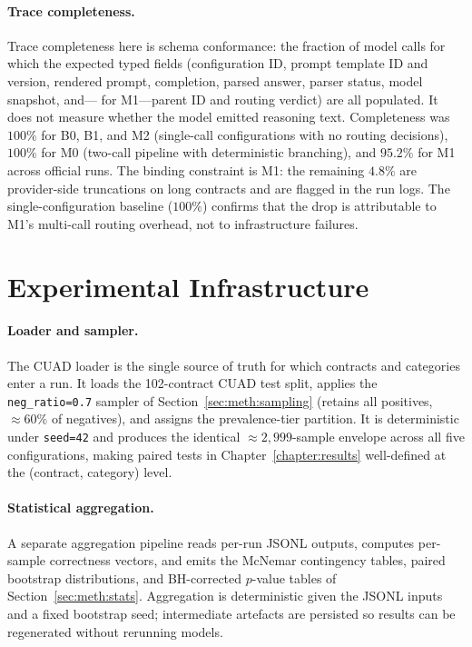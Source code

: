 \paragraph{Trace completeness.}
Trace completeness here is schema conformance: the fraction of model calls for
which the expected typed fields (configuration ID, prompt template ID and version,
rendered prompt, completion, parsed answer, parser status, model snapshot, and---
for M1---parent ID and routing verdict) are all populated. It does not measure
whether the model emitted reasoning text. Completeness was $100\%$ for B0, B1,
and M2 (single-call configurations with no routing decisions), $100\%$ for M0
(two-call pipeline with deterministic branching), and $95.2\%$ for M1 across
official runs. The binding constraint is M1: the remaining $4.8\%$ are
provider-side truncations on long contracts and are flagged in the run logs.
The single-configuration baseline ($100\%$) confirms that the drop is
attributable to M1's multi-call routing overhead, not to infrastructure failures.

\section{Experimental Infrastructure}\label{sec:sys:infra}

\paragraph{Loader and sampler.}
The CUAD loader is the single source of truth for which contracts and categories
enter a run. It loads the 102-contract CUAD test split, applies the
\texttt{neg\_ratio=0.7} sampler of Section~\ref{sec:meth:sampling} (retains all
positives, $\approx\!60\%$ of negatives), and assigns the prevalence-tier
partition. It is deterministic under \texttt{seed=42} and produces the identical
$\approx\!2{,}999$-sample envelope across all five configurations, making paired
tests in Chapter~\ref{chapter:results} well-defined at the (contract, category)
level.

\paragraph{Statistical aggregation.}
A separate aggregation pipeline reads per-run JSONL outputs, computes per-sample
correctness vectors, and emits the McNemar contingency tables, paired bootstrap
distributions, and BH-corrected $p$-value tables of Section~\ref{sec:meth:stats}.
Aggregation is deterministic given the JSONL inputs and a fixed bootstrap seed;
intermediate artefacts are persisted so results can be regenerated without
rerunning models.


